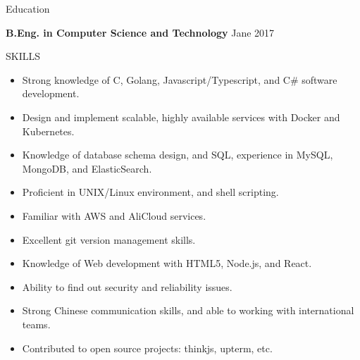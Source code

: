 \documentclass{resume} %
\begin{document}

\begin{rSection}{Education}

  {\bf B.Eng. in Computer Science and Technology} \hfill {Jane 2017}

\end{rSection}

\begin{rSection}{SKILLS}
  \begin{itemize}
    \itemsep -3pt {}
    \item Strong knowledge of C, Golang, Javascript/Typescript, and C\# software development.
    \item Design and implement scalable, highly available services with Docker and Kubernetes.
    \item Knowledge of database schema design, and SQL, experience in MySQL, MongoDB, and ElasticSearch.
    \item Proficient in UNIX/Linux environment, and shell scripting.
    \item Familiar with AWS and AliCloud services.
    \item Excellent git version management skills.
    \item Knowledge of Web development with HTML5, Node.js, and React.
    \item Ability to find out security and reliability issues.
    \item Strong Chinese communication skills, and able to working with international teams.
    \item Contributed to open source projects: thinkjs, upterm, etc.
  \end{itemize}
\end{rSection}
\end{document}
